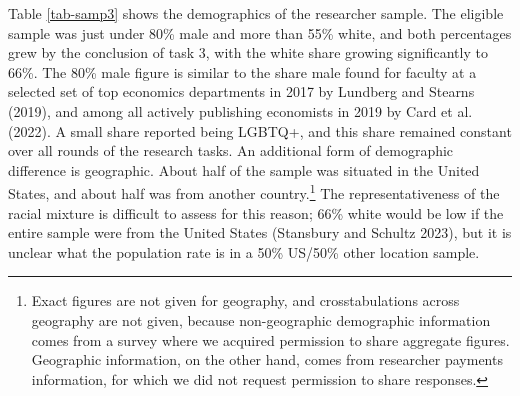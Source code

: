 \documentclass[
  letterpaper,
  DIV=11,
  numbers=noendperiod]{scrartcl}
\begin{document}
Table \ref{tab-samp3} shows the demographics of the researcher sample.
The eligible sample was just under 80\% male and more than 55\% white,
and both percentages grew by the conclusion of task 3, with the white
share growing significantly to 66\%. The 80\% male figure is similar to
the share male found for faculty at a selected set of top economics
departments in 2017 by Lundberg and Stearns (2019), and among all
actively publishing economists in 2019 by Card et al. (2022). A small
share reported being LGBTQ+, and this share remained constant over all
rounds of the research tasks. An additional form of demographic
difference is geographic. About half of the sample was situated in the
United States, and about half was from another country.\footnote{Exact
  figures are not given for geography, and crosstabulations across
  geography are not given, because non-geographic demographic
  information comes from a survey where we acquired permission to share
  aggregate figures. Geographic information, on the other hand, comes
  from researcher payments information, for which we did not request
  permission to share responses.} The representativeness of the racial
mixture is difficult to assess for this reason; 66\% white would be low
if the entire sample were from the United States (Stansbury and Schultz
2023), but it is unclear what the population rate is in a 50\% US/50\%
other location sample.
\end{document}
